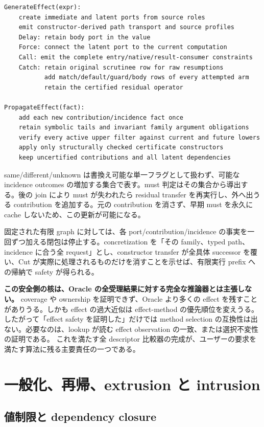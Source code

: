 \documentclass[11pt,a4paper]{article}
\theoremstyle{remark}
\begin{document}
\begin{Verbatim}[fontsize=\small]
GenerateEffect(expr):
    create immediate and latent ports from source roles
    emit constructor-derived path transport and source profiles
    Delay: retain body port in the value
    Force: connect the latent port to the current computation
    Call: emit the complete entry/native/result-consumer constraints
    Catch: retain original scrutinee row for raw resumptions
           add match/default/guard/body rows of every attempted arm
           retain the certified residual operator

PropagateEffect(fact):
    add each new contribution/incidence fact once
    retain symbolic tails and invariant family argument obligations
    verify every active upper filter against current and future lowers
    apply only structurally checked certificate constructors
    keep uncertified contributions and all latent dependencies
\end{Verbatim}

same/different/unknown は書換え可能な単一フラグとして扱わず、可能な incidence outcomes の増加する集合で表す。must 判定はその集合から導出する。後の join により must が失われたら residual transfer を再実行し、外へ出うる contribution を追加する。元の contribution を消さず、早期 must を永久に cache しないため、この更新が可能になる。

固定された有限 graph に対しては、各 port/contribution/incidence の事実を一回ずつ加える閉包は停止する。concretization を「その family、typed path、incidence に合う全 request」とし、constructor transfer が全具体 successor を覆い、Cut が実際に処理されるものだけを消すことを示せば、有限実行 prefix への帰納で safety が得られる。

\textbf{この安全側の核は、Oracle の全受理結果に対する完全な推論器とは主張しない。}
coverage や ownership を証明できず、Oracle より多くの effect を残すことがありうる。しかも effect の過大近似は effect-method の優先順位を変えうる。したがって「effect safety を証明した」だけでは method selection の互換性は出ない。必要なのは、lookup が読む effect observation の一致、または選択不変性の証明である。
これを満たす全 descriptor 比較器の完成が、ユーザーの要求を満たす算法に残る主要責任の一つである。

\section{一般化、再帰、extrusion と intrusion}

\subsection{値制限と dependency closure}
\end{document}

